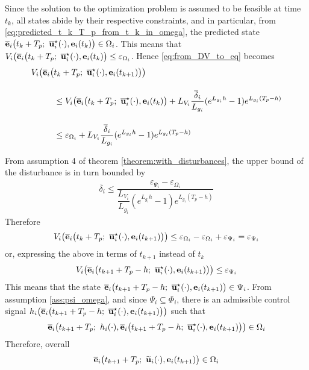 \begin{gg_box}
Since the solution to the optimization problem is assumed to be feasible
at time $t_k$, all states abide by their respective constraints, and in
particular, from \eqref{eq:predicted_t_k_T_p_from_t_k_in_omega},
the predicted state
$\overline{\vect{e}}_i\big(t_k + T_p;\ \overline{\vect{u}}_i^{\star}(\cdot), \vect{e}_i(t_k)\big) \in \Omega_i$.
This means that
$V_i\big(\overline{\vect{e}}_i\big(t_k + T_p;\ \overline{\vect{u}}_i^{\star}(\cdot), \vect{e}_i(t_k)\big) \leq \varepsilon_{\Omega_i}$.
Hence \eqref{eq:from_DV_to_eq} becomes
\begin{align}
  V_i\big(\overline{\vect{e}}_i\big(&t_k + T_p;\ \overline{\vect{u}}_i^{\star}(\cdot), \vect{e}_i(t_{k+1})\big)\big) \\[2.5ex]
  &\leq V_i\big(\overline{\vect{e}}_i\big(t_k + T_p;\ \overline{\vect{u}}_i^{\star}(\cdot), \vect{e}_i(t_k)\big) + L_{V_i} \dfrac{\overline{\delta}_i}{L_{g_i}} (e^{L_{g_i}h} - 1) e^{L_{g_i} (T_p - h)} \\[2.5ex]
  &\leq \varepsilon_{\Omega_i} + L_{V_i} \dfrac{\overline{\delta}_i}{L_{g_i}} (e^{L_{g_i}h} - 1) e^{L_{g_i} (T_p - h)}
\label{eq:from_DV_to_eq_2}
\end{align}

From assumption 4 of theorem \eqref{theorem:with_disturbances},
the upper bound of the disturbance is in turn bounded by
\begin{align}
  \overline{\delta}_i \leq \dfrac{\varepsilon_{\Psi_i} - \varepsilon_{\Omega_i}}{\dfrac{L_{V_i}}{L_{g_i}} (e^{L_{g_i}h} - 1) e^{L_{g_i} (T_p - h)}}
  \label{eq:delta_inequality}
\end{align}
Therefore
\begin{align}
  V_i\big(\overline{\vect{e}}_i\big(t_k + T_p;\ \overline{\vect{u}}_i^{\star}(\cdot), \vect{e}_i(t_{k+1})\big)\big)
  \leq  \varepsilon_{\Omega_i} - \varepsilon_{\Omega_i} + \varepsilon_{\Psi_i} = \varepsilon_{\Psi_i}
\end{align}
or, expressing the above in terms of $t_{k+1}$ instead of $t_k$
\begin{align}
  V_i\big(\overline{\vect{e}}_i\big(t_{k+1} + T_p-h;\ \overline{\vect{u}}_i^{\star}(\cdot), \vect{e}_i(t_{k+1})\big)\big) \leq \varepsilon_{\Psi_i}
\end{align}
This means that the state
$\overline{\vect{e}}_i\big(t_{k+1} + T_p-h;\ \overline{\vect{u}}_i^{\star}(\cdot), \vect{e}_i(t_{k+1})\big) \in \Psi_i$.
From assumption \eqref{ass:psi_omega},
and since $\Psi_i \subseteq \Phi_i$, there is an admissible control signal
$h_i\big(\overline{\vect{e}}_i\big(t_{k+1} + T_p-h;\ \overline{\vect{u}}_i^{\star}(\cdot), \vect{e}_i(t_{k+1})\big)\big)$
such that
\begin{align}
  \overline{\vect{e}}_i\big(t_{k+1} + T_p;\ h_i(\cdot), \overline{\vect{e}}_i\big(t_{k+1} + T_p - h;\ \overline{\vect{u}}_i^{\star}(\cdot), \vect{e}_i(t_{k+1})\big)\big) \in \Omega_i
\end{align}
Therefore, overall
\begin{align}
  \overline{\vect{e}}_i\big(t_{k+1} + T_p;\ \widetilde{\vect{u}}_i(\cdot), \vect{e}_i(t_{k+1}) \big) \in \Omega_i
  \label{eq:feasibility_3}
\end{align}
\qedsymbol
\end{gg_box}
